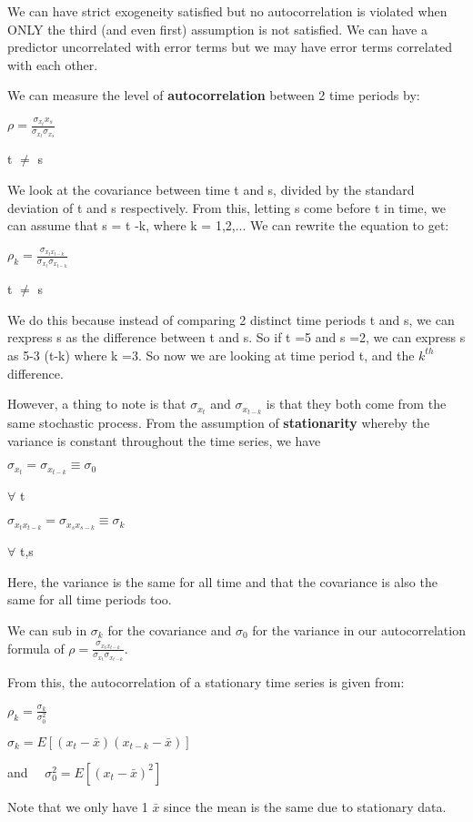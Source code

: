 \documentclass[11pt, oneside]{article}
\theoremstyle{definition}
\begin{document}
We can have strict exogeneity satisfied but no autocorrelation is violated when ONLY the third (and even first) assumption is not satisfied. We can have a predictor uncorrelated with error terms but we may have error terms correlated with each other.

We can measure the level of \textbf{autocorrelation} between 2 time periods by:
\begin{center}
$\rho = \frac{\sigma_{x_{t}}x_{s}}{\sigma_{x_t}\sigma_{x_s}}$

t $\neq$ s
\end{center}
We look at the covariance between time t and s, divided by the standard deviation of t and s respectively. From this, letting s come before t in time, we can assume that s = t -k, where k = 1,2,...
We can rewrite the equation to get:

\begin{center}
$\rho_k = \frac{\sigma_{x_{t}x_{t-k}}}{\sigma_{x_t}\sigma_{x_{t-k}}}$

t $\neq$ s
\end{center}


We do this because instead of comparing 2 distinct time periods t and s, we can rexpress s as the difference between t and s. So if t =5 and s =2, we can express s as 5-3 (t-k) where k =3. So now we are looking at time period t, and the $k^{th}$ difference.

However, a thing to note is that $\sigma_{x_t}$ and $\sigma_{x_{t-k}}$ is that they both come from the same stochastic process. From the assumption of \textbf{stationarity} whereby the variance is constant throughout the time series, we have
\begin{center}
$\sigma_{x_t} = \sigma_{x_{t-k}} \equiv \sigma_0$

$\forall$ t

$\sigma_{x_{t}x_{t-k}} = \sigma_{x_{s}x_{s-k}} \equiv \sigma_k$

$\forall$ t,s
\end{center}

Here, the variance is the same for all time and that the covariance is also the same for all time periods too.

We can sub in $\sigma_k$ for the covariance and $\sigma_0$ for the variance in our autocorrelation formula of $\rho = \frac{\sigma_{x_{t}x_{t-k}}}{\sigma_{x_{t}}\sigma_{x_{t-k}}}$.

From this, the autocorrelation of a stationary time series is given from:
\begin{center}
$\rho_k = \frac{\sigma_k}{\sigma_0^2}$

 $\sigma_k = E[(x_t - \bar{x})(x_{t-k} - \bar{x})]$

and $\quad \sigma_0^2 = E[(x_t - \bar{x})^2]$
\end{center}
Note that we only have 1 $\bar{x}$ since the mean is the same due to stationary data.
\end{document}
